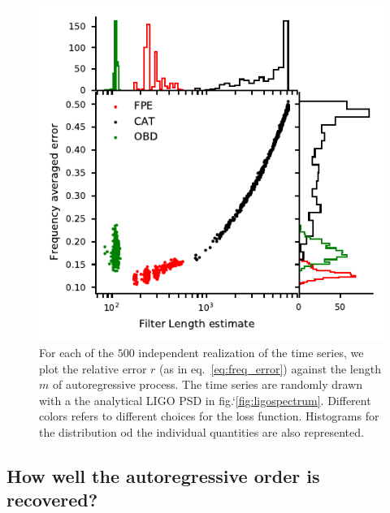 \documentclass[twocolumn,showpacs,preprintnumbers,nofootinbib,prd,
superscriptaddress,10pt]{revtex4-1}
\begin{document}
\begin{figure}
    \centering
    \includegraphics[width = \linewidth]{Images/optimisers_comparison/ligo/error_length_contour.pdf}
    \caption{For each of the $500$ independent realization of the time series, we plot the relative error $r$ (as in eq.~\eqref{eq:freq_error}) against the length $m$ of autoregressive process. The time series are randomly drawn with a the analytical LIGO PSD in fig.`\ref{fig:ligospectrum}. Different colors refers to different choices for the loss function. Histograms for the distribution od the individual quantities are also represented.}
    \label{fig:LigoOrderError}
\end{figure}

\subsection{How well the autoregressive order is recovered?}
\end{document}
